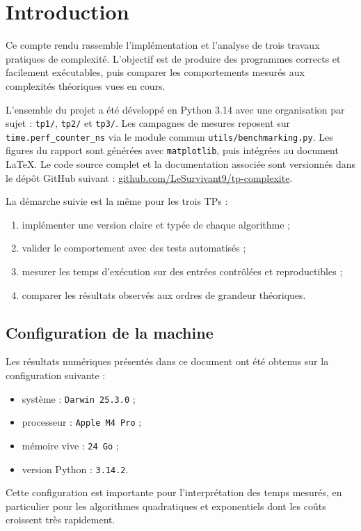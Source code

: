 \section{Introduction}\label{sec:introduction}

Ce compte rendu rassemble l'impl\'{e}mentation et l'analyse de trois travaux
pratiques de complexit\'{e}.
L'objectif est de produire des programmes
corrects et facilement ex\'{e}cutables, puis comparer les comportements mesur\'{e}s
aux complexit\'{e}s th\'{e}oriques vues en cours.

L'ensemble du projet a \'{e}t\'{e} d\'{e}velopp\'{e} en Python 3.14 avec une
organisation par sujet : \texttt{tp1/}, \texttt{tp2/} et \texttt{tp3/}.
Les
campagnes de mesures reposent sur \texttt{time.perf\_counter\_ns} via le module
commun \texttt{utils/benchmarking.py}.
Les figures du rapport sont g\'{e}n\'{e}r\'{e}es
avec \texttt{matplotlib}, puis int\'{e}gr\'{e}es au document LaTeX.
Le code source complet et la documentation associ\'{e}e sont versionn\'{e}s dans le
d\'{e}p\^{o}t GitHub suivant :
\href{https://github.com/LeSurvivant9/tp-complexite}{github.com/LeSurvivant9/tp-complexite}.

La d\'{e}marche suivie est la m\^{e}me pour les trois TPs :

\begin{enumerate}
	\item impl\'{e}menter une version claire et typ\'{e}e de chaque algorithme ;
	\item valider le comportement avec des tests automatis\'{e}s ;
	\item mesurer les temps d'ex\'{e}cution sur des entr\'{e}es contr\^{o}l\'{e}es et
	      reproductibles ;
	\item comparer les r\'{e}sultats observ\'{e}s aux ordres de grandeur th\'{e}oriques.
\end{enumerate}

\subsection{Configuration de la machine}\label{subsec:introduction-machine}

Les r\'{e}sultats num\'{e}riques pr\'{e}sent\'{e}s dans ce document ont \'{e}t\'{e}
obtenus sur la configuration suivante :

\begin{itemize}
	\item syst\`{e}me : \texttt{Darwin 25.3.0} ;
	\item processeur : \texttt{Apple M4 Pro} ;
	\item m\'{e}moire vive : \texttt{24 Go} ;
	\item version Python : \texttt{3.14.2}.
\end{itemize}

Cette configuration est importante pour l'interpr\'{e}tation des temps mesur\'{e}s,
en particulier pour les algorithmes quadratiques et exponentiels dont les co\^{u}ts
croissent tr\`{e}s rapidement.
